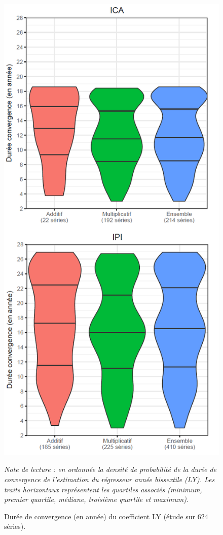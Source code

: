 \documentclass[12pt, a4paper, french]{article}
\begin{document}
\begin{figure}[!ht]
\begin{center}
 \includegraphics[scale=0.65]{img/LYconvergence2.png}
 \caption[Durée de convergence (en année) du coefficient LY (étude sur 624 séries)]{Durée de convergence (en année) du coefficient LY (étude sur 624 séries).}
 \label{fig:LYconvergence}
\end{center} \vspace{-0.3cm}
\footnotesize
\emph{Note de lecture : en ordonnée la densité de probabilité de la durée de convergence de l'estimation du régresseur année bissextile (LY). Les traits horizontaux représentent les quartiles associés (minimum, premier quartile, médiane, troisième quartile et maximum).}
\end{figure}
\end{document}
